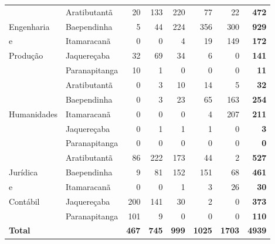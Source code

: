 \begin{table}[h]
\begin{tabular}{ll rrrrrr}
\midrule				& Aratibutantã    &  20 & 133 & 220 &  77 &  22 & \textbf{472}\\ 
	Engenharia          & Baependinha     &   5 &  44 & 224 & 356 & 300 & \textbf{929}\\ 
    e                	& Itamaracanã     &   0 &   0 &   4 &  19 & 149 & \textbf{172}\\ 
    Produção            & Jaquereçaba     &  32 &  69 &  34 &   6 &   0 & \textbf{141}\\ 
                        & Paranapitanga   &  10 &   1 &   0 &   0 &   0 &  \textbf{11}\\ 
\midrule
                    & Aratibutantã        &   0 &  3 &   10 &  14 &   5 &  \textbf{32}\\ 
                          & Baependinha   &   0 &  3 &   23 &  65 & 163 & \textbf{254}\\ 
	Humanidades           & Itamaracanã   &   0 &  0 &    0 &   4 & 207 & \textbf{211}\\ 
                          & Jaquereçaba   &   0 &  1 &    1 &   1 &   0 &   \textbf{3}\\ 
                          & Paranapitanga &   0 &  0 &    0 &   0 &   0 &   \textbf{0}\\ 
\midrule
					& Aratibutantã        &  86 & 222 & 173 &  44 &   2 & \textbf{527}\\ 
    Jurídica        	& Baependinha     &   9 &  81 & 152 & 151 &  68 & \textbf{461}\\ 
    e                   & Itamaracanã     &   0 &   0 &   1 &   3 &  26 &  \textbf{30}\\ 
	Contábil    		& Jaquereçaba     & 200 & 141 &  30 &   2 &   0 & \textbf{373}\\ 
                        & Paranapitanga   & 101 &   9 &   0 &   0 &   0 & \textbf{110}\\ 
\midrule
\textbf{Total}		& & \textbf{467} & \textbf{745} & \textbf{999} & \textbf{1025}& \textbf{1703}&\textbf{4939}\\        
   \bottomrule
\end{tabular}
\end{table}
